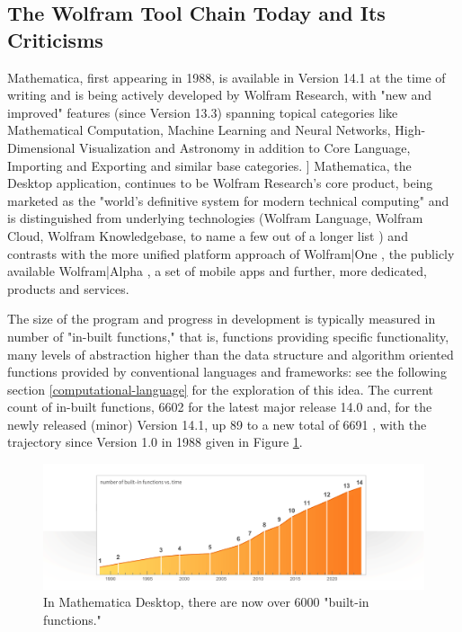 \subsection{The Wolfram Tool Chain Today and Its Criticisms} \label{tool-chain-with-critique}

Mathematica, first appearing in 1988, is available in Version 14.1 at the time of writing and is being actively developed by Wolfram Research, with "new and improved" features (since Version 13.3) spanning topical categories like Mathematical Computation, Machine Learning and Neural Networks, High-Dimensional Visualization and Astronomy in addition to Core Language, Importing and Exporting and similar base categories. \cite{wolfram_research_export_nodate}] Mathematica, the Desktop application, continues to be Wolfram Research's core product, being marketed as the "world's definitive system for modern technical computing" \cite{noauthor_wolfram_nodate-1} and is distinguished from underlying technologies (Wolfram Language, Wolfram Cloud, Wolfram Knowledgebase, to name a few out of a longer list \cite{noauthor_wolfram_nodate-1}) and contrasts with the more unified platform approach of Wolfram|One \cite{noauthor_wolframone_nodate}, the publicly available Wolfram|Alpha \cite{noauthor_wolframalpha_nodate}, a set of mobile apps \cite{noauthor_wolfram_nodate} and further, more dedicated, products and services.

The size of the program and progress in development is typically measured in number of "in-built functions," that is, functions providing specific functionality, many levels of abstraction higher than the data structure and algorithm oriented functions provided by conventional languages and frameworks: see the following section \ref{computational-language} for the exploration of this idea. The current count of in-built functions, 6602 for the latest major release 14.0 \cite{wolfram_research_inc_summary_2024} and, for the newly released (minor) Version 14.1, up 89 to a new total of 6691 \cite{wolfram_research_inc_yet_2024}, with the trajectory since Version 1.0 in 1988 given in Figure \ref{fig:MM-number-of-built-in-functions}.

\begin{figure}[h]
    \centering
    \includegraphics[scale=0.2]{images/introduction/stats-chart.png}
    \caption{In Mathematica Desktop, there are now over 6000 "built-in functions." \cite{noauthor_wolfram_nodate-1}}
    \label{fig:MM-number-of-built-in-functions}
\end{figure}

